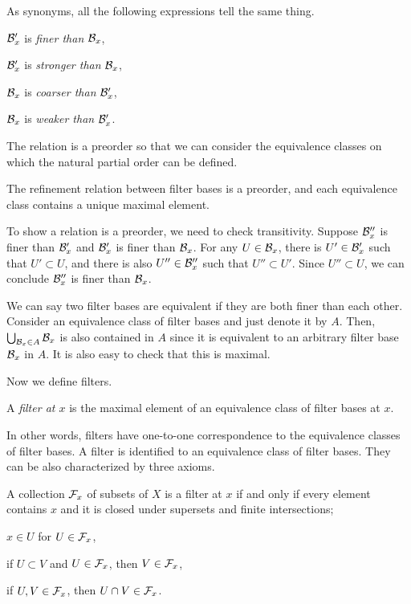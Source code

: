 \documentclass{../crs}
\begin{document}
As synonyms, all the following expressions tell the same thing.
\begin{cond}
\item $\mathcal{B}'_x$ is \emph{finer than} $\mathcal{B}_x$,
\item $\mathcal{B}'_x$ is \emph{stronger than} $\mathcal{B}_x$,
\item $\mathcal{B}_x$ is \emph{coarser than} $\mathcal{B}'_x$,
\item $\mathcal{B}_x$ is \emph{weaker than} $\mathcal{B}'_x$.
\end{cond}
The relation is a preorder so that we can consider the equivalence classes on which the natural partial order can be defined.

\begin{prop}
The refinement relation between filter bases is a preorder, and each equivalence class contains a unique maximal element.
\end{prop}
\begin{pf}
To show a relation is a preorder, we need to check transitivity.
Suppose $\mathcal{B}''_x$ is finer than $\mathcal{B}'_x$ and $\mathcal{B}'_x$ is finer than $\mathcal{B}_x$.
For any $U\in\mathcal{B}_x$, there is $U'\in\mathcal{B}'_x$ such that $U'\subset U$, and there is also $U''\in\mathcal{B}''_x$ such that $U''\subset U'$.
Since $U''\subset U$, we can conclude $\mathcal{B}''_x$ is finer than $\mathcal{B}_x$.

We can say two filter bases are equivalent if they are both finer than each other.
Consider an equivalence class of filter bases and just denote it by $A$.
Then, $\bigcup_{\mathcal{B}_x\in A}\mathcal{B}_x$ is also contained in $A$ since it is equivalent to an arbitrary filter base $\mathcal{B}_x$ in $A$.
It is also easy to check that this is maximal.
\end{pf}

Now we define filters.

\begin{defn}
A \emph{filter at $x$} is the maximal element of an equivalence class of filter bases at $x$.
\end{defn}

In other words, filters have one-to-one correspondence to the equivalence classes of filter bases.
A filter is identified to an equivalence class of filter bases.
They can be also characterized by three axioms.

\begin{thm}
A collection $\mathcal{F}_x$ of subsets of $X$ is a filter at $x$ if and only if every element contains $x$ and it is closed under supersets and finite intersections;
\begin{cond}
\item $x\in U$ for $U\in\mathcal{F}_x$,
\item if $U\subset V$ and $U\in\mathcal{F}_x$, then $V\in\mathcal{F}_x$,
\item if $U,V\in\mathcal{F}_x$, then $U\cap V\in\mathcal{F}_x$.
\end{cond}
\end{thm}
\begin{pf}
\end{pf}
\end{document}
